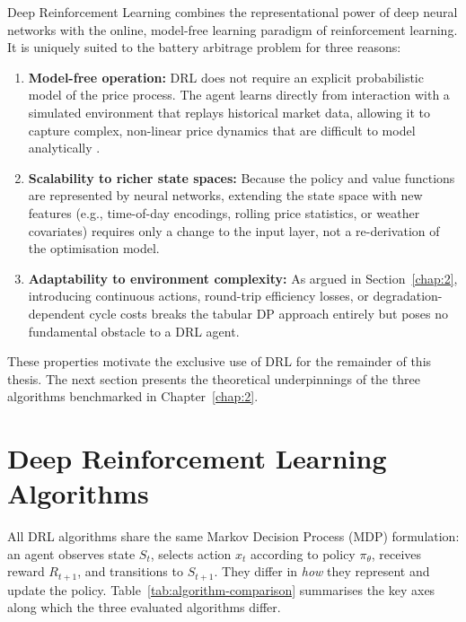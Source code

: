 Deep Reinforcement Learning combines the representational power of deep neural networks with the online, model-free learning paradigm of reinforcement learning. It is uniquely suited to the battery arbitrage problem for three reasons:

\begin{enumerate}
    \item \textbf{Model-free operation:} DRL does not require an explicit probabilistic model of the price process. The agent learns directly from interaction with a simulated environment that replays historical market data, allowing it to capture complex, non-linear price dynamics that are difficult to model analytically \cite{li2018deepreinforcementlearningoverview, ZHENG2024112084}.
    \item \textbf{Scalability to richer state spaces:} Because the policy and value functions are represented by neural networks, extending the state space with new features (e.g., time-of-day encodings, rolling price statistics, or weather covariates) requires only a change to the input layer, not a re-derivation of the optimisation model.
    \item \textbf{Adaptability to environment complexity:} As argued in Section~\ref{chap:2}, introducing continuous actions, round-trip efficiency losses, or degradation-dependent cycle costs breaks the tabular DP approach entirely but poses no fundamental obstacle to a DRL agent.
\end{enumerate}

These properties motivate the exclusive use of DRL for the remainder of this thesis. The next section presents the theoretical underpinnings of the three algorithms benchmarked in Chapter~\ref{chap:2}.

\section{Deep Reinforcement Learning Algorithms}
\label{sec:drl-algorithms}

All DRL algorithms share the same Markov Decision Process (MDP) formulation: an agent observes state $S_t$, selects action $x_t$ according to policy $\pi_\theta$, receives reward $R_{t+1}$, and transitions to $S_{t+1}$. They differ in \textit{how} they represent and update the policy. Table~\ref{tab:algorithm-comparison} summarises the key axes along which the three evaluated algorithms differ.

